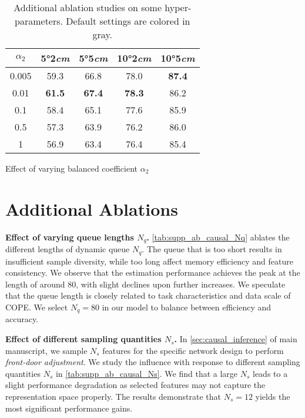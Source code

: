 \begin{table}[htbp]
    \vspace{0.2cm}  %

    \begin{subtable}[t]{1.0\linewidth}  %
        \centering
        \setlength\tabcolsep{8pt}%
        \begin{tabular}{c|cccc}
            \toprule
            $\alpha_{2}$ & 5°2\emph{cm} & 5°5\emph{cm} & 10°2\emph{cm}  & 10°5\emph{cm}\\
            \midrule
            0.005  & 59.3          & 66.8    &78.0  &\textbf{87.4}   \\
            \rowcolor{mygray}
            0.01 & \textbf{61.5}          &\textbf{67.4}    &\textbf{78.3} &86.2   \\
            0.1 & 58.4          &65.1    &77.6 &85.9   \\
            0.5  &  57.3         &63.9    &76.2 &86.0   \\
            1  &  56.9         &63.4    &76.4 &85.4   \\
            \bottomrule
        \end{tabular}
        \caption{Effect of varying balanced coefficient $\alpha_2$}
        \label{tab:supp_ab_kd_a2}
    \end{subtable}
     
    \caption{Additional ablation studies on some hyper-parameters. Default settings are colored in \colorbox{mygray}{gray}.}
    \label{table:supp_ablation_detail}
    \vspace{-0.3cm}
\end{table}

\section{Additional Ablations}
\label{sec:suppl_additional_ablations}
\noindent
{\bf Effect of varying queue lengths $N_q$.} \cref{tab:supp_ab_causal_Nq} ablates the different lengths of dynamic queue $N_q$. The queue that is too short results in insufficient sample diversity, while too long affect memory efficiency and feature consistency.
We observe that the estimation performance achieves the peak at the length of around 80, with slight declines upon further increases.
We speculate that the queue length is closely related to task characteristics and data scale of COPE.
We select $N_q = 80$ in our model to balance between efficiency and accuracy.

\vspace{0.1cm}
\noindent
{\bf Effect of different sampling quantities $N_s$.} In \cref{sec:causal_inference} of main manuscript, we sample $N_s$ features for the specific network design to perform \emph{front-door adjustment}. We study the influence with response to different sampling quantities $N_s$ in \cref{tab:supp_ab_causal_Ns}. We find that a large $N_s$ leads to a slight performance degradation as selected features may not capture the representation space properly. The results demonstrate that $N_s = 12$ yields the most significant performance gains.


